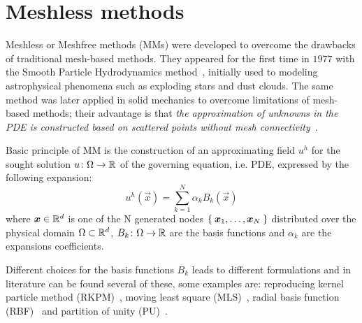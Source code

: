 \chapter{Meshless methods}\label{chap:meshless_methods}

Meshless or Meshfree methods (MMs) were developed to overcome the drawbacks of traditional mesh-based methods.
They appeared for the first time in $1977$ with the Smooth Particle Hydrodynamics method~\cite{Belytschko:meshless_overview}, initially used to modeling astrophysical phenomena such as exploding stars and dust clouds. The same method was later applied in solid mechanics to overcome limitations of mesh-based methods; their advantage is that \textit{the approximation of unknowns in the PDE is constructed based on scattered points without mesh connectivity}~\cite{Chen:meshless_overview_after_20_years}.

Basic principle of MM is the construction of an approximating field $u^{h}$ for the sought solution $u\colon\Omega\to\mathbb{R}$ of the governing equation, i.e. PDE, expressed by the following expansion:
\begin{equation}
	\label{eqn:general_u_discretization}
	u^{h}(\vec{x}) = \sum_{k= 1}^{N} {\alpha_k B_k(\vec{x})}
\end{equation}
where $\boldsymbol{x} \in \mathbb{R}^{d}$ is one of the N generated nodes $\Set{\boldsymbol{x}_1, \dots, \boldsymbol{x}_N}$ distributed over the physical domain $\Omega \subset \mathbb{R}^{d}$, $B_k\colon\Omega\to\mathbb{R}$ are the basis functions and $\alpha_k$ are the expansions coefficients.

Different choices for the basis functions $B_k$ leads to different formulations and in literature can be found several of these, some examples are:  reproducing kernel particle method (RKPM)~\cite{Liu:RKPM}, moving least square (MLS)~\cite{Lancaster:MLS}, radial basis function (RBF)~\cite{Kansa:RBF_1, Kansa:RBF_2} and partition of unity (PU)~\cite{Schweitzer:PU}.

